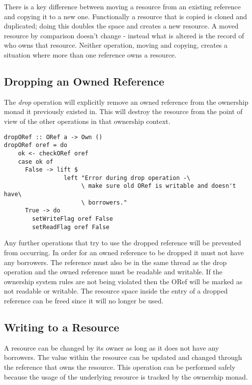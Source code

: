 \documentclass[onehalf,11pt]{beavtex}
\begin{document}
There is a key difference between moving a resource from an existing reference
and copying it to a new one.  Functionally a resource that is copied is cloned
and duplicated; doing this doubles the space and creates a new resource.
A moved resource by comparison doesn't change - instead what is altered is the
record of who owns that resource.  Neither operation, moving and copying,
creates a situation where more than one reference owns a resource.

\subsection{Dropping an Owned Reference}

The \textit{drop} operation will explicitly remove an owned reference from the
ownership monad it previously existed in.
This will destroy the resource from the point of view of the other operations
in that ownership context.

\begin{verbatim}
dropORef :: ORef a -> Own ()
dropORef oref = do
    ok <- checkORef oref
    case ok of
      False -> lift $ 
                 left "Error during drop operation -\
                      \ make sure old ORef is writable and doesn't have\
                      \ borrowers."
      True -> do
        setWriteFlag oref False
        setReadFlag oref False
\end{verbatim}

Any further operations that try to use the dropped reference will be prevented
from occurring.
In order for an owned reference to be dropped it must not have any borrowers.
The reference must also be in the same thread as the drop operation and
the owned reference must be readable and writable.  If the ownership system rules
are not being violated then the ORef will be marked as not readable or writable.
The resource space inside the entry of a dropped reference can be freed since
it will no longer be used.

\subsection{Writing to a Resource}

A resource can be changed by its owner as long as it does not have any borrowers.
The value within the resource can be updated and changed through the reference
that owns the resource. This operation can be performed safely because the usage
of the underlying resource is tracked by the ownership monad.
\end{document}
